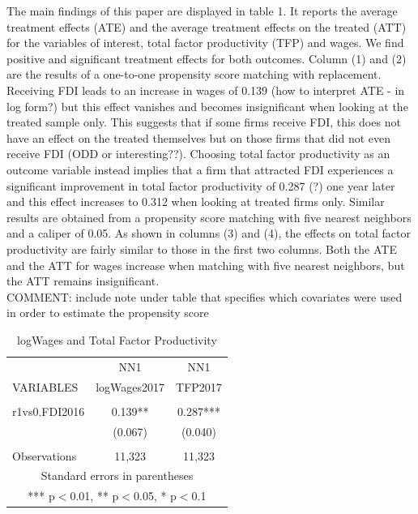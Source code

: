 \documentclass[a4paper,12pt]{scrartcl}
\begin{document}
The main findings of this paper are displayed in table 1. It reports the average treatment effects (ATE) and the average treatment effects on the treated (ATT) for the variables of interest, total factor productivity (TFP) and wages. We find positive and significant treatment effects for both outcomes. Column (1) and (2) are the results of a one-to-one propensity score matching with replacement. Receiving FDI leads to an increase in wages of 0.139 (how to interpret ATE - in log form?) but this effect vanishes and becomes insignificant when looking at the treated sample only. This suggests that if some firms receive FDI, this does not have an effect on the treated themselves but on those firms that did not even receive FDI (ODD or interesting??).  Choosing total factor productivity as an outcome variable instead implies that a firm that attracted FDI experiences a significant improvement in total factor productivity of 0.287 (?) one year later and this effect increases to 0.312 when looking at treated firms only. Similar results are obtained from a propensity score matching with five nearest neighbors and a caliper of 0.05. As shown in columns (3) and (4), the effects on total factor productivity are fairly similar to those in the first two columns. Both the ATE and the ATT for wages increase when matching with five nearest neighbors, but the ATT remains insignificant. \\

COMMENT: include note under table that specifies which covariates were used in order to estimate the propensity score

\begin{table}[htbp]\centering
\caption{logWages and Total Factor Productivity}
\begin{tabular}{lcc} \hline
 &NN1 & NN1\\
VARIABLES & logWages2017 & TFP2017 \\ \hline
 &  &  \\
r1vs0.FDI2016 & 0.139** & 0.287*** \\
 & (0.067) & (0.040) \\
 &  &  \\
 Observations & 11,323 & 11,323 \\ \hline
\multicolumn{3}{c}{ Standard errors in parentheses} \\
\multicolumn{3}{c}{ *** p$<$0.01, ** p$<$0.05, * p$<$0.1} \\
\end{tabular}
\end{table}
\end{document}
